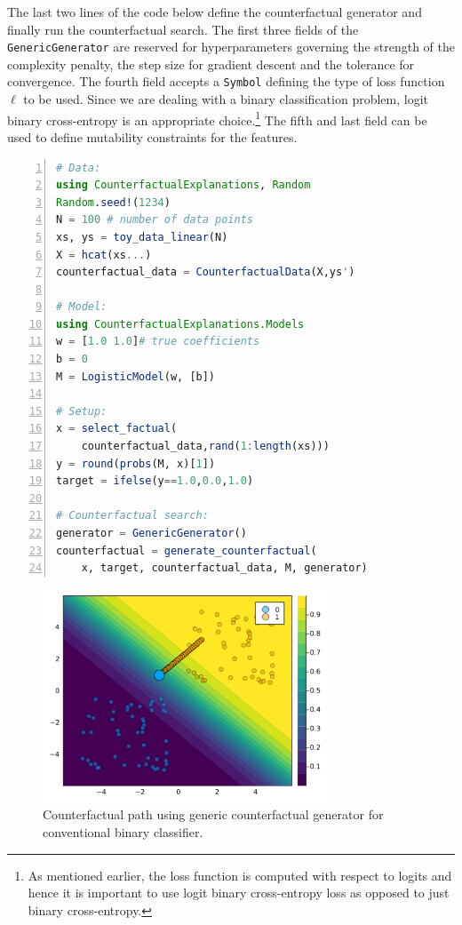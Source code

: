 \documentclass{juliacon}
\begin{document}
The last two lines of the code below define the counterfactual generator
and finally run the counterfactual search. The first three fields of the
\texttt{GenericGenerator} are reserved for hyperparameters governing the
strength of the complexity penalty, the step size for gradient descent
and the tolerance for convergence. The fourth field accepts a
\texttt{Symbol} defining the type of loss function \(\ell\) to be used.
Since we are dealing with a binary classification problem, logit binary
cross-entropy is an appropriate choice.\footnote{As mentioned earlier,
  the loss function is computed with respect to logits and hence it is
  important to use logit binary cross-entropy loss as opposed to just
  binary cross-entropy.} The fifth and last field can be used to define
mutability constraints for the features.

\begin{lstlisting}[language=Julia, escapechar=@, numbers=left] 
# Data:
using CounterfactualExplanations, Random
Random.seed!(1234)
N = 100 # number of data points
xs, ys = toy_data_linear(N)
X = hcat(xs...)
counterfactual_data = CounterfactualData(X,ys')

# Model:
using CounterfactualExplanations.Models 
w = [1.0 1.0]# true coefficients
b = 0
M = LogisticModel(w, [b])

# Setup:
x = select_factual(
    counterfactual_data,rand(1:length(xs)))
y = round(probs(M, x)[1])
target = ifelse(y==1.0,0.0,1.0) 

# Counterfactual search:
generator = GenericGenerator()
counterfactual = generate_counterfactual(
    x, target, counterfactual_data, M, generator)
\end{lstlisting}

\begin{figure}

{\centering \includegraphics[width=3.33333in,height=2.5in]{www/ce_binary.png}

}

\caption{\label{fig-binary}Counterfactual path using generic
counterfactual generator for conventional binary classifier.}

\end{figure}
\end{document}
